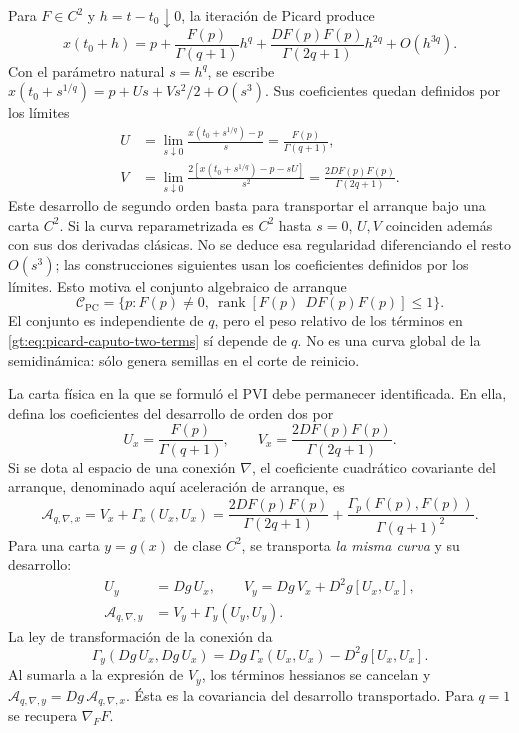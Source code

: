Para $F\in C^2$ y $h=t-t_0\downarrow0$, la iteración de Picard produce
\begin{equation}
 x(t_0+h)=p+
 \frac{F(p)}{\Gamma(q+1)}h^q+
 \frac{DF(p)F(p)}{\Gamma(2q+1)}h^{2q}
 +O(h^{3q}).
 \label{gt:eq:picard-caputo-two-terms}
\end{equation}
Con el parámetro natural $s=h^q$, se escribe
$x(t_0+s^{1/q})=p+Us+Vs^2/2+O(s^3)$. Sus coeficientes quedan
definidos por los límites
\begin{equation}
 \begin{aligned}
 U&=\lim_{s\downarrow0}\frac{x(t_0+s^{1/q})-p}{s}
   =\frac{F(p)}{\Gamma(q+1)},\\
 V&=\lim_{s\downarrow0}
 \frac{2[x(t_0+s^{1/q})-p-sU]}{s^2}
   =\frac{2DF(p)F(p)}{\Gamma(2q+1)}.
 \end{aligned}
 \label{gt:eq:picard-s-derivatives}
\end{equation}
Este desarrollo de segundo orden basta para transportar el arranque bajo
una carta $C^2$. Si la curva reparametrizada es $C^2$ hasta $s=0$,
$U,V$ coinciden además con sus dos derivadas clásicas. No se deduce esa
regularidad diferenciando el resto $O(s^3)$; las construcciones siguientes
usan los coeficientes definidos por los límites.
Esto motiva el conjunto algebraico de arranque
\begin{equation}
 \mathcal C_{\mathrm{PC}}
 =\{p:F(p)\ne0,\
 \operatorname{rank}[F(p)\ \ DF(p)F(p)]\le1\}.
 \label{gt:eq:picard-caputo-connecting}
\end{equation}
El conjunto es independiente de $q$, pero el peso relativo de los términos en
\eqref{gt:eq:picard-caputo-two-terms} sí depende de $q$. No es una curva
global de la semidinámica: sólo genera semillas en el corte de reinicio.

La carta física en la que se formuló el PVI debe permanecer identificada.
En ella, defina los coeficientes del desarrollo de orden dos por
\[
 U_x=\frac{F(p)}{\Gamma(q+1)},\qquad
 V_x=\frac{2DF(p)F(p)}{\Gamma(2q+1)}.
\]
Si se dota al espacio de una conexión $\nabla$, el coeficiente cuadrático
covariante del arranque, denominado aquí aceleración de arranque, es
\begin{equation}
 \mathcal A_{q,\nabla,x}=V_x+\Gamma_x(U_x,U_x)=
 \frac{2DF(p)F(p)}{\Gamma(2q+1)}
 +\frac{\Gamma_p(F(p),F(p))}{\Gamma(q+1)^2}.
 \label{gt:eq:covariant-picard-acceleration}
\end{equation}
Para una carta $y=g(x)$ de clase $C^2$, se transporta \emph{la misma curva}
y su desarrollo:
\begin{equation}
 \begin{aligned}
 U_y&=Dg\,U_x,\qquad
 V_y=Dg\,V_x+D^2g[U_x,U_x],\\
 \mathcal A_{q,\nabla,y}&=V_y+\Gamma_y(U_y,U_y).
 \end{aligned}
 \label{gt:eq:transported-picard-jet}
\end{equation}
La ley de transformación de la conexión da
\[
 \Gamma_y(Dg\,U_x,Dg\,U_x)
 =Dg\,\Gamma_x(U_x,U_x)-D^2g[U_x,U_x].
\]
Al sumarla a la expresión de $V_y$, los términos hessianos se cancelan y
$\mathcal A_{q,\nabla,y}=Dg\,\mathcal A_{q,\nabla,x}$. Ésta es la
covariancia del desarrollo transportado. Para $q=1$ se recupera $\nabla_FF$.

